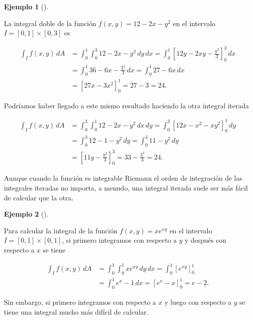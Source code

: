 \documentclass[
  a4paper,
]{scrreport}
\theoremstyle{definition}
\theoremstyle{definition}
\newtheorem{example}{Ejemplo}[chapter]
\theoremstyle{definition}
\theoremstyle{plain}
\theoremstyle{plain}
\theoremstyle{plain}
\theoremstyle{remark}
\begin{document}
\begin{example}[]\protect\hypertarget{exm-integrales-iteradas}{}\label{exm-integrales-iteradas}

La integral doble de la función \(f(x,y)=12-2x-y^2\) en el intervalo
\(I=[0,1]\times[0,3]\) es

\begin{align*}
\int_I f(x,y)\, dA 
&= \int_0^1 \int_0^3 12-2x-y^2 \,dy\,dx
= \int_0^1 \left[12y-2xy-\frac{y^3}{3}\right]_0^3\,dx \\
&= \int_0^1 36-6x-\frac{3^3}{3}\, dx
= \int_0^1 27-6x\,dx \\
&= [27x-3x^2]_0^1 
= 27-3
= 24. 
\end{align*}

Podríamos haber llegado a este mismo resultado haciendo la otra integral
iterada

\begin{align*}
\int_I f(x,y)\, dA 
&= \int_0^3 \int_0^1 12-2x-y^2 \,dx\,dy
= \int_0^3 \left[12x-x^2-xy^2\right]_0^1\,dy \\
&= \int_0^3 12-1-y^2\, dy
= \int_0^3 11-y^2\,dy \\
&= \left[11y-\frac{y^3}{3}\right]_0^3 
= 33 - \frac{3^3}{3}
= 24.
\end{align*}

\end{example}

\begin{tcolorbox}[enhanced jigsaw, bottomtitle=1mm, title=\textcolor{quarto-callout-important-color}{\faExclamation}\hspace{0.5em}{Importante}, colbacktitle=quarto-callout-important-color!10!white, coltitle=black, leftrule=.75mm, colback=white, toptitle=1mm, toprule=.15mm, titlerule=0mm, opacitybacktitle=0.6, colframe=quarto-callout-important-color-frame, bottomrule=.15mm, arc=.35mm, rightrule=.15mm, breakable, left=2mm, opacityback=0]

Aunque cuando la función es integrable Riemann el orden de integración
de las integrales iteradas no importa, a menudo, una integral iterada
suele ser más fácil de calcular que la otra.

\end{tcolorbox}

\begin{example}[]\protect\hypertarget{exm-integrales-iteradas-2}{}\label{exm-integrales-iteradas-2}

Para calcular la integral de la función \(f(x,y) = xe^{xy}\) en el
intervalo \(I=[0,1]\times [0,1]\), si primero integramos con respecto a
\(y\) y después con respecto a \(x\) se tiene

\begin{align*}
\int_I f(x,y)\, dA 
&= \int_0^1 \int_0^1 xe^{xy}\,dy\,dx 
= \int_0^1 \left[e^{xy}\right]_0^1 \\
&= \int_0^1 e^x-1\,dx
= [e^x-x]_0^1
= e - 2.
\end{align*}

Sin embargo, si primero integramos con respecto a \(x\) y luego con
respecto a \(y\) se tiene una integral mucho más difícil de calcular.

\end{example}
\end{document}

